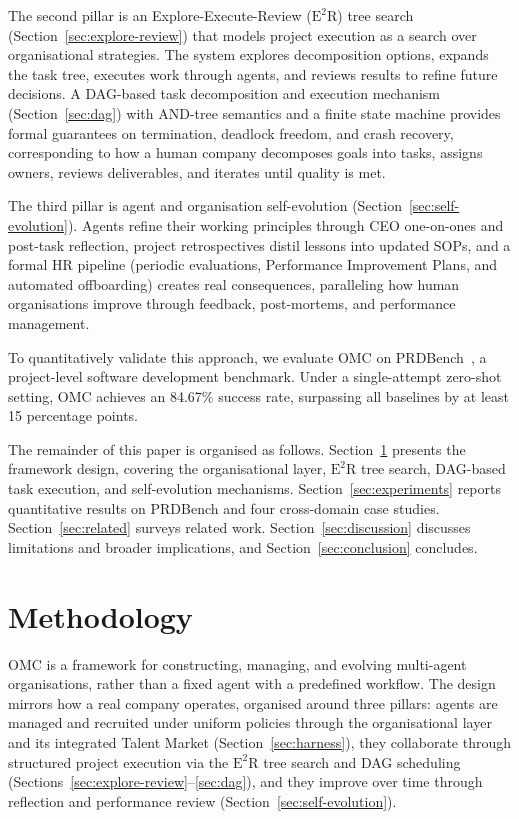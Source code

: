 \documentclass[11pt,a4paper]{article}
\begin{document}
The second pillar is an Explore-Execute-Review ($\text{E}^2$R) tree search (Section~\ref{sec:explore-review}) that models project execution as a search over organisational strategies.  The system explores decomposition options, expands the task tree, executes work through agents, and reviews results to refine future decisions.  A DAG-based task decomposition and execution mechanism (Section~\ref{sec:dag}) with AND-tree semantics and a finite state machine provides formal guarantees on termination, deadlock freedom, and crash recovery, corresponding to how a human company decomposes goals into tasks, assigns owners, reviews deliverables, and iterates until quality is met.

The third pillar is agent and organisation self-evolution (Section~\ref{sec:self-evolution}).  Agents refine their working principles through CEO one-on-ones and post-task reflection, project retrospectives distil lessons into updated SOPs, and a formal HR pipeline (periodic evaluations, Performance Improvement Plans, and automated offboarding) creates real consequences, paralleling how human organisations improve through feedback, post-mortems, and performance management.

To quantitatively validate this approach, we evaluate OMC on PRDBench~\cite{fu2025prdbench}, a project-level software development benchmark.  Under a single-attempt zero-shot setting, OMC achieves an 84.67\% success rate, surpassing all baselines by at least 15 percentage points.

The remainder of this paper is organised as follows.  Section~\ref{sec:methodology} presents the framework design, covering the organisational layer, $\text{E}^2$R tree search, DAG-based task execution, and self-evolution mechanisms.  Section~\ref{sec:experiments} reports quantitative results on PRDBench and four cross-domain case studies.  Section~\ref{sec:related} surveys related work.  Section~\ref{sec:discussion} discusses limitations and broader implications, and Section~\ref{sec:conclusion} concludes.


\section{Methodology}
\label{sec:methodology}

OMC is a framework for constructing, managing, and evolving multi-agent organisations, rather than a fixed agent with a predefined workflow.  The design mirrors how a real company operates, organised around three pillars: agents are managed and recruited under uniform policies through the organisational layer and its integrated Talent Market (Section~\ref{sec:harness}), they collaborate through structured project execution via the $\text{E}^2$R tree search and DAG scheduling (Sections~\ref{sec:explore-review}--\ref{sec:dag}), and they improve over time through reflection and performance review (Section~\ref{sec:self-evolution}).
\end{document}
